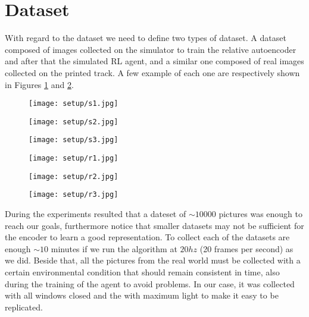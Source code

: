 \section{Dataset}
With regard to the dataset we need to define two types of dataset. A dataset composed of images collected on the simulator to train the relative autoencoder and after that the simulated RL agent, and a similar one composed of real images collected on the printed track. A few example of each one are respectively shown in Figures \ref{fig:datasetsim} and \ref{fig:datasetreal}.

\begin{figure}[h]
    \begin{minipage}{.33\textwidth}
      \centering
      \texttt{[image: setup/s1.jpg]}
    \end{minipage}%
    \begin{minipage}{.33\textwidth}
        \centering
        \texttt{[image: setup/s2.jpg]}
    \end{minipage}%
    \begin{minipage}{.33\textwidth}
        \centering
        \texttt{[image: setup/s3.jpg]}
    \end{minipage}
    \label{fig:datasetsim}
  \end{figure}

\begin{figure}[h]
\begin{minipage}{.33\textwidth}
    \centering
    \texttt{[image: setup/r1.jpg]}
\end{minipage}%
\begin{minipage}{.33\textwidth}
    \centering
    \texttt{[image: setup/r2.jpg]}
\end{minipage}%
\begin{minipage}{.33\textwidth}
    \centering
    \texttt{[image: setup/r3.jpg]}
\end{minipage}
\label{fig:datasetreal}
\end{figure}

During the experiments resulted that a dateset of $\sim 10000$ pictures was enough to reach our goals, furthermore notice that smaller datasets may not be sufficient for the encoder to learn a good representation. To collect each of the datasets are enough $\sim10$ minutes if we run the algorithm at $20hz$ (20 frames per second) as we did. Beside that, all the pictures from the real world must be collected with a certain environmental condition that should remain consistent in time, also during the training of the agent to avoid problems. In our case, it was collected with all windows closed and the with maximum light to make it easy to be replicated. 

